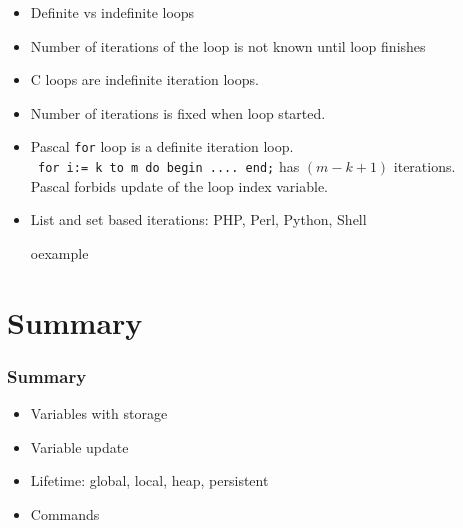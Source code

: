 \begin{frame}
\begin{itemize}[<+->]
\begin{columns}
\begin{column}{.5\linewidth}
{%
} 
 \end{column}
\end{columns}
\end{itemize}
\end{frame}


\begin{frame}
\begin{itemize}
 \item Definite vs indefinite loops
 \item {} Number of iterations of the loop is not known until loop finishes
\item C loops are indefinite iteration loops.
\item {} Number of iterations is fixed when loop started.
\item Pascal \texttt{for} loop is a definite iteration loop. \\
	\texttt{ for i:= k to m  do begin .... end;}  has $(m-k+1)$ iterations.\\
	Pascal forbids update of the loop index variable.
\item List and set based iterations: PHP, Perl, Python, Shell
\begin{beamercolorbox}{oexample}
\codelistePhp
\end{beamercolorbox}
\end{itemize}
\end{frame}

\section{Summary}
\begin{frame}
 \frametitle{Summary}
\begin{itemize}
 \item Variables with storage
 \item Variable update
 \item Lifetime: global, local, heap, persistent
 \item Commands
\end{itemize}

\end{frame}






